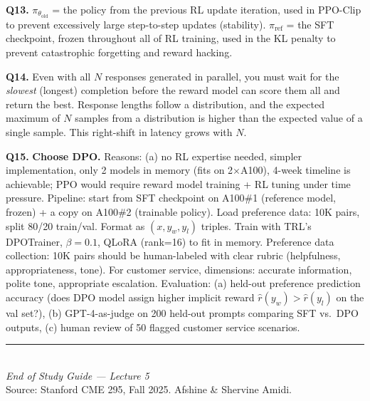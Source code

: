 \documentclass[11pt, a4paper]{article}
\begin{document}
\textbf{Q13.} $\pi_{\theta_\text{old}}$ = the policy from the previous RL update iteration, used in PPO-Clip to prevent excessively large step-to-step updates (stability). $\pi_{\text{ref}}$ = the SFT checkpoint, frozen throughout all of RL training, used in the KL penalty to prevent catastrophic forgetting and reward hacking.

\textbf{Q14.} Even with all $N$ responses generated in parallel, you must wait for the \emph{slowest} (longest) completion before the reward model can score them all and return the best. Response lengths follow a distribution, and the expected maximum of $N$ samples from a distribution is higher than the expected value of a single sample. This right-shift in latency grows with $N$.

\textbf{Q15.} \textbf{Choose DPO.} Reasons: (a) no RL expertise needed, simpler implementation, only 2 models in memory (fits on 2$\times$A100), 4-week timeline is achievable; PPO would require reward model training + RL tuning under time pressure. Pipeline: start from SFT checkpoint on A100\#1 (reference model, frozen) + a copy on A100\#2 (trainable policy). Load preference data: 10K pairs, split 80/20 train/val. Format as $(x, y_w, y_l)$ triples. Train with TRL's DPOTrainer, $\beta=0.1$, QLoRA (rank=16) to fit in memory. Preference data collection: 10K pairs should be human-labeled with clear rubric (helpfulness, appropriateness, tone). For customer service, dimensions: accurate information, polite tone, appropriate escalation. Evaluation: (a) held-out preference prediction accuracy (does DPO model assign higher implicit reward $\hat{r}(y_w) > \hat{r}(y_l)$ on the val set?), (b) GPT-4-as-judge on 200 held-out prompts comparing SFT vs.\ DPO outputs, (c) human review of 50 flagged customer service scenarios.

\vspace{1em}
\begin{center}
\rule{0.5\textwidth}{0.4pt}\\[6pt]
{\small\textit{End of Study Guide --- Lecture 5}}\\[4pt]
{\small Source: Stanford CME 295, Fall 2025. Afshine \& Shervine Amidi.}
\end{center}
\end{document}
